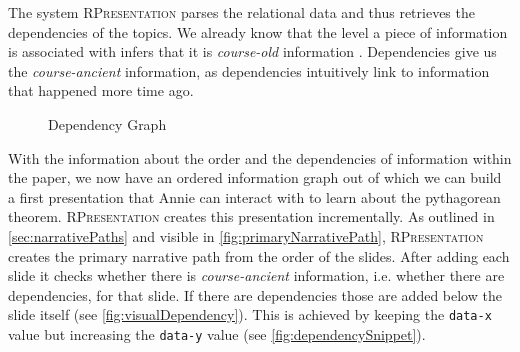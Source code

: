 \documentclass[twoside, 12pt]{article}
\newcommand{\sys}{\textsc{RPresentation}\xspace}
\begin{document}

The system \sys parses the relational data and thus retrieves the dependencies of the topics. We already know that the level a piece of information is associated with infers that it is \textit{course-old} information . Dependencies give us the \textit{course-ancient} information, as dependencies intuitively link to information that happened more time ago.\\

\begin{figure}
\vspace{-0pt}
  \begin{center}
\vspace{-5pt}
  \caption{Dependency Graph}
  \label{fig:depGraphPythagoreanFull}
\vspace{12pt}
  \end{center}
\end{figure}

\begin{figure}
\vspace{-50pt}
\end{figure}

With the information about the order and the dependencies of information within the paper, we now have an ordered information graph out of which we can build a first presentation that Annie can interact with to learn about the pythagorean theorem. \sys creates this presentation incrementally. As outlined in \autoref{sec:narrativePaths} and visible in \autoref{fig:primaryNarrativePath}, \sys creates the primary narrative path from the order of the slides. After adding each slide it checks whether there is \textit{course-ancient} information, i.e. whether there are dependencies, for that slide. If there are dependencies those are added below the slide itself (see \autoref{fig:visualDependency}). This is achieved by keeping the \texttt{data-x} value but increasing the \texttt{data-y} value (see \autoref{fig:dependencySnippet}).\\
\end{document}
